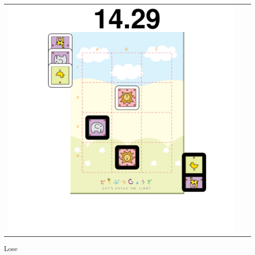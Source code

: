\documentclass{beamer}
\begin{document}
\begin{frame}
\begin{tabular}{ccc}
\includegraphics[scale = 0.15]{val3.pdf}\\ 
\end{tabular}

Lose


\end{frame}
\end{document}
